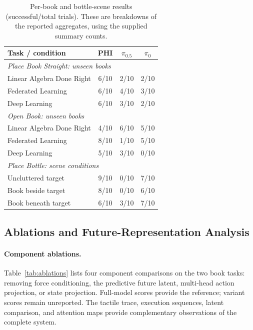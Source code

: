 \documentclass{article}
\begin{document}
\begin{table}[!tbh]
\centering\small
\setlength{\tabcolsep}{6pt}
\renewcommand{\arraystretch}{1.05}
\caption{Per-book and bottle-scene results (successful/total trials). These are breakdowns of the reported aggregates, using the supplied summary counts.}
\label{tab:object_breakdown}
\begin{tabular}{lccc}
\toprule
\textbf{Task / condition} & \textbf{PHI} & $\pi_{0.5}$ & $\pi_0$ \\
\midrule
\multicolumn{4}{l}{\textit{Place Book Straight: unseen books}} \\
Linear Algebra Done Right & 6/10 & 2/10 & 2/10 \\
Federated Learning & 6/10 & 4/10 & 3/10 \\
Deep Learning & 6/10 & 3/10 & 2/10 \\
\midrule
\multicolumn{4}{l}{\textit{Open Book: unseen books}} \\
Linear Algebra Done Right & 4/10 & 6/10 & 5/10 \\
Federated Learning & 8/10 & 1/10 & 5/10 \\
Deep Learning & 5/10 & 3/10 & 0/10 \\
\midrule
\multicolumn{4}{l}{\textit{Place Bottle: scene conditions}} \\
Uncluttered target & 9/10 & 0/10 & 7/10 \\
Book beside target & 8/10 & 0/10 & 6/10 \\
Book beneath target & 6/10 & 3/10 & 7/10 \\
\bottomrule
\end{tabular}
\end{table}

\subsection{Ablations and Future-Representation Analysis}
\label{sec:ablations}

\paragraph{Component ablations.}
Table~\ref{tab:ablations} lists four component comparisons on the two book tasks: removing force conditioning, the predictive future latent, multi-head action projection, or state projection. Full-model scores provide the reference; variant scores remain unreported. The tactile trace, execution sequences, latent comparison, and attention maps provide complementary observations of the complete system.
\end{document}

